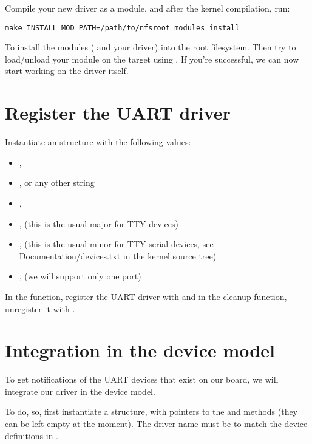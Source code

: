 Compile your new driver as a module, and after the kernel compilation, run:

\begin{verbatim}
make INSTALL_MOD_PATH=/path/to/nfsroot modules_install
\end{verbatim}

To install the modules ( and your driver) into the
root filesystem. Then try to load/unload your module on the target
using . If you're successful, we can now start working
on the driver itself.

\section{Register the UART driver}

Instantiate an  structure with the following values:

\begin{itemize}
\item {}, 
\item {},  or any other string
\item {}, 
\item {},  (this is the usual major for TTY devices)
\item {},  (this is the usual minor for TTY serial
  devices, see Documentation/devices.txt in the kernel source tree)
\item {},  (we will support only one port)
\end{itemize}

In the  function, register the UART driver with
 and in the cleanup function,
unregister it with .

\section{Integration in the device model}

To get notifications of the UART devices that exist on our board, we
will integrate our driver in the device model.

To do, so, first instantiate a  structure, with
pointers to the  and  methods (they can
be left empty at the moment). The driver name must be
 to match the device definitions in
.

